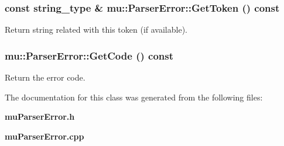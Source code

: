 \subsubsection[GetToken]{\setlength{\rightskip}{0pt plus 5cm}const {\bf string\_\-type} \& mu::ParserError::GetToken () const}\label{classmu_1_1ParserError_3ddb4de710a8b0485e1b4060ccc7f08f}


Return string related with this token (if available). 

\subsubsection[GetCode]{ mu::ParserError::GetCode () const}\label{classmu_1_1ParserError_ad82b1aeb00b5e64a56956490febd2ec}


Return the error code. 



The documentation for this class was generated from the following files:\begin{CompactItemize}
\item 
{\bf muParserError.h}\item 
{\bf muParserError.cpp}\end{CompactItemize}
